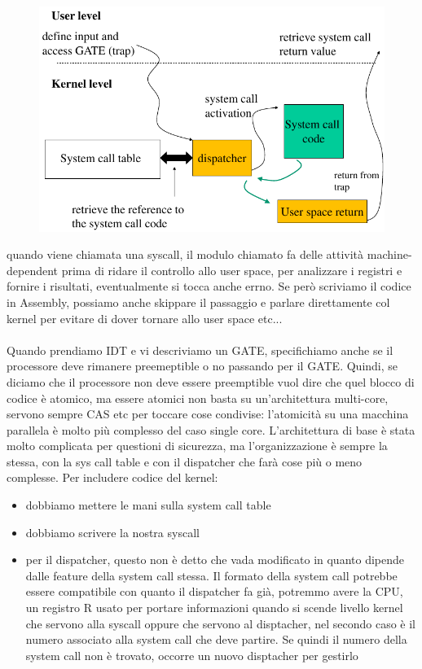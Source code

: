 \documentclass[12pt, oneside]{extbook}
\begin{document}
\begin{figure}[!h]
	\includegraphics[scale=0.3]{immagini/syscall_dispatching_base.png}
\end{figure}
quando viene chiamata una syscall, il modulo chiamato fa delle attività machine-dependent prima di ridare il controllo allo user space, per analizzare i registri e fornire i risultati, eventualmente si tocca anche errno. Se però scriviamo il codice in Assembly, possiamo anche skippare il passaggio e parlare direttamente col kernel per evitare di dover tornare allo user space etc...\\\\ Quando prendiamo IDT e vi descriviamo un GATE, specifichiamo anche se il processore deve rimanere preemeptible o no passando per il GATE. Quindi, se diciamo che il processore non deve essere preemptible vuol dire che quel blocco di codice è atomico, ma essere atomici non basta su un'architettura multi-core, servono sempre CAS etc per toccare cose condivise: l'atomicità su una macchina parallela è molto più complesso del caso single core. L'architettura di base è stata molto complicata per questioni di sicurezza, ma l'organizzazione è sempre la stessa, con la sys call table e con il dispatcher che farà cose più o meno complesse. Per includere codice del kernel:
\begin{itemize}
\item dobbiamo mettere le mani sulla system call table
\item dobbiamo scrivere la nostra syscall
\item per il dispatcher, questo non è detto che vada modificato in quanto dipende dalle feature della system call stessa. Il formato della system call potrebbe essere compatibile con quanto il dispatcher fa già, potremmo avere la CPU, un registro R usato per portare informazioni quando si scende livello kernel che servono alla syscall oppure che servono al disptacher, nel secondo caso è il numero associato alla system call che deve partire. Se quindi il numero della system call non è trovato, occorre un nuovo disptacher per gestirlo
\end{itemize}
\end{document}

